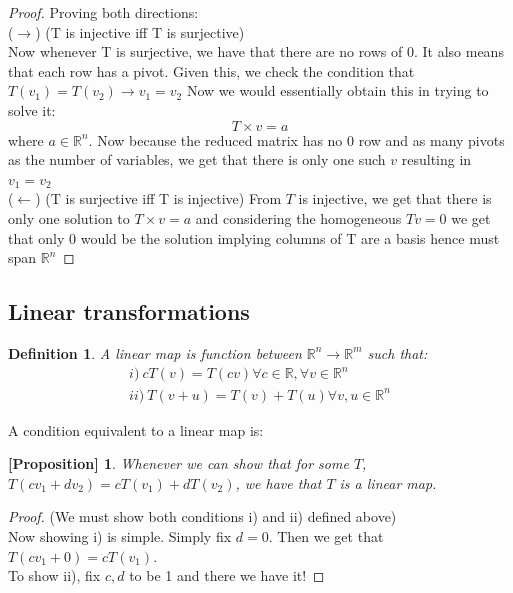 \documentclass[titlepage]{article}
\newtheorem{prop}{[Proposition]}
\newtheorem{definition}{Definition}[subsection]
\numberwithin{equation}{subsection}
\begin{document}
\begin{proof} Proving both directions:
\\
($\rightarrow$) (T is injective iff T is surjective)
\\
Now whenever T is surjective, we have that there are no rows of 0. It also means that each row has a pivot. Given this, we check the condition that $T(v_{1}) = T(v_{2}) \rightarrow v_{1} = v_{2}$ Now we would essentially obtain this in trying to solve it:
\begin{equation*}
    T \times v = a
\end{equation*}
where $a \in \mathbb{R}^n$. Now because the reduced matrix has no 0 row and as many pivots as the number of variables, we get that there is only one such $v$ resulting in $v_{1} = v_{2}$
\\
($\leftarrow$) (T is surjective iff T is injective)
From $T$ is injective, we get that there is only one solution to $T \times v = a$ and considering the homogeneous $Tv=0$ we get that only 0 would be the solution implying columns of T are a basis hence must span $\mathbb{R}^n$
 \tag*{\qedhere}

\end{proof}

\subsection{Linear transformations}

\begin{definition}
A linear map is function between $\mathbb{R}^n \to \mathbb{R}^m$ such that:
\begin{align*}
    i) \ cT(v) = T(cv) \forall c \in \mathbb{R}, \forall v \in \mathbb{R}^n\\
    ii) \ T(v + u) = T(v) + T(u) \forall v,u \in \mathbb{R}^n
\end{align*}
\end{definition}

A condition equivalent to a linear map is:
\begin{prop}
Whenever we can show that for some $T$, $T(cv_{1} + dv_{2}) = cT(v_{1}) + dT(v_{2})$, we have that $T$ is a linear map.
\end{prop}

\begin{proof}(We must show both conditions i) and ii) defined above)
\\

Now showing i) is simple. Simply fix $d=0$. Then we get that $T(cv_{1} + 0) = cT(v_{1})$.
\\

To show ii), fix $c,d$ to be 1 and there we have it!

\end{proof}
\end{document}
